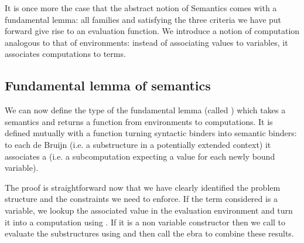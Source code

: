 \begin{center}
\end{center}

It is once more the case that the abstract notion of Semantics comes
with a fundamental lemma: all   families  and
 satisfying the three criteria we have put forward give rise
to an evaluation function. We introduce a notion of computation
 analogous to that of environments: instead of associating
values to variables, it associates computations to terms.

\begin{center}
\end{center}

\subsection{Fundamental lemma of semantics}\label{sec:fundamentallemma}

We can now define the type of the fundamental lemma (called \semfun{}) which
takes a semantics and returns a function from environments to computations.
It is defined mutually with a
function  turning syntactic binders into semantic binders: to
each de Bruijn  (i.e. a substructure in a potentially extended
context) it associates a  (i.e. a subcomputation expecting a
value for each newly bound variable).

\begin{center}
\end{center}

The \semfun{} proof is straightforward now that we have clearly
identified the problem structure and the constraints we need to enforce.
If the term considered is a variable, we lookup the associated value in
the evaluation environment and turn it into a computation using .
If it is a non variable constructor then we call  to evaluate the
substructures using  and then call the ebra to combine
these results.

